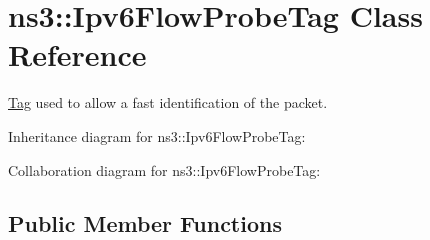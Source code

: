 \hypertarget{classns3_1_1Ipv6FlowProbeTag}{}\section{ns3\+:\+:Ipv6\+Flow\+Probe\+Tag Class Reference}
\label{classns3_1_1Ipv6FlowProbeTag}


\hyperlink{classns3_1_1Tag}{Tag} used to allow a fast identification of the packet.  




Inheritance diagram for ns3\+:\+:Ipv6\+Flow\+Probe\+Tag\+:


Collaboration diagram for ns3\+:\+:Ipv6\+Flow\+Probe\+Tag\+:
\subsection*{Public Member Functions}
